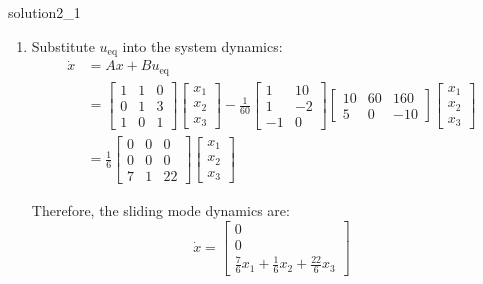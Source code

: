 \begin{solution}{}{solution2_1}
\begin{enumerate}
		\item Substitute \( u_{\text{eq}} \) into the system dynamics:
		      \[
			      \begin{aligned}
				      \dot{x} & = Ax + Bu_{\text{eq}}                             \\
				              & = \begin{bmatrix}
					                  1 & 1 & 0 \\
					                  0 & 1 & 3 \\
					                  1 & 0 & 1
				                  \end{bmatrix} \begin{bmatrix}
					                                x_1 \\ x_2 \\ x_3
				                                \end{bmatrix}
				      - \frac{1}{60} \begin{bmatrix}
					                     1  & 10 \\
					                     1  & -2 \\
					                     -1 & 0
				                     \end{bmatrix} \begin{bmatrix}
					                                   10 & 60 & 160 \\
					                                   5  & 0  & -10
				                                   \end{bmatrix} \begin{bmatrix}
					                                                 x_1 \\ x_2 \\ x_3
				                                                 \end{bmatrix} \\
				              & = \frac{1}{6}\begin{bmatrix}
					                             0 & 0 & 0  \\
					                             0 & 0 & 0  \\
					                             7 & 1 & 22
				                             \end{bmatrix} \begin{bmatrix}
					                                           x_1 \\ x_2 \\ x_3
				                                           \end{bmatrix}
			      \end{aligned}
		      \]

		      Therefore, the sliding mode dynamics are:
		      \[
			      \dot{x} = \begin{bmatrix}
				      0 \\
				      0 \\
				      \frac{7}{6}x_1 + \frac{1}{6}x_2 + \frac{22}{6}x_3
			      \end{bmatrix}
		      \]
	\end{enumerate}
\end{solution}
